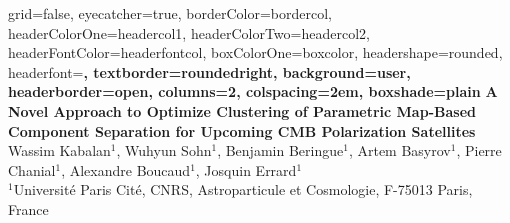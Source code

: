 \documentclass[a2paper,portrait,fontscale=0.9]{baposter}
\begin{document}
\begin{poster}{
	grid=false,
	eyecatcher=true, 
	borderColor=bordercol,
	headerColorOne=headercol1,
	headerColorTwo=headercol2,
	headerFontColor=headerfontcol,
	boxColorOne=boxcolor,
	headershape=rounded,
	headerfont=\Large\sf\bf,
	textborder=roundedright,
	background=user,
	headerborder=open,
    columns=2,
    colspacing=2em,
  boxshade=plain
}
{
}
{\sf\bf
    A Novel Approach to Optimize Clustering of Parametric Map-Based Component Separation for Upcoming CMB Polarization Satellites
}
{
    \vspace{1em} Wassim Kabalan$^{1}$, Wuhyun Sohn$^{1}$, Benjamin Beringue$^{1}$, Artem Basyrov$^{1}$, Pierre Chanial$^{1}$, Alexandre Boucaud$^{1}$, Josquin Errard$^{1}$\\
    \vspace{1em}
    {\footnotesize 
        $^{1}$Université Paris Cité, CNRS, Astroparticule et Cosmologie, F-75013 Paris, France
    }
}
{
\setlength\fboxsep{0pt}
\setlength\fboxrule{0.5pt}
}


\end{poster}
\end{document}
